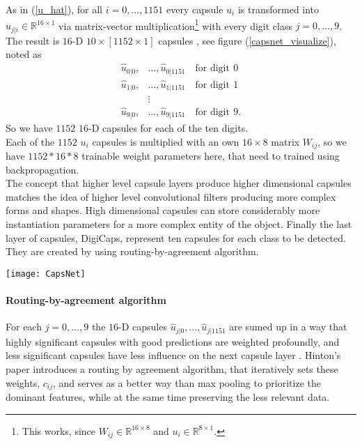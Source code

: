 \documentclass{article}
\begin{document}
{As in (\ref{u_hat}), for all $i=0, \ldots, 1151$ every capsule $u_i$ is transformed into $\hat{u}_{j|i} \in \mathbb{R}^{16 \times 1}$ via matrix-vector multiplication\footnote{This works, since $W_{ij} \in \mathbb{R}^{16 \times 8}$ and $u_i \in \mathbb{R}^{8 \times 1}$.} with every digit class $j = 0, \ldots ,9$.
The result is  $16$-D $10 \times [1152 \times 1]$  capsules , see figure (\ref{capsnet_visualize}), noted as
\begin{align*}
\hat{u}_{0|0}, &\ldots , \hat{u}_{0|1151} \quad \text{for digit} \ \, 0 \\
\hat{u}_{1|0}, &\ldots, \hat{u}_{1|1151} \quad \text{for digit} \ \, 1 \\
& \vdots \\
\hat{u}_{9|0}, &\ldots, \hat{u}_{9|1151} \quad \text{for digit} \ \, 9.
\end{align*}
So we have $1152$ $16$-D capsules for each of the ten digits.\\
Each of the $1152$ $u_i$ capsules is multiplied with an own $16 \times 8$ matrix $W_{ij}$, so we have $1152*16*8$ trainable weight parameters here, that need to trained using backpropagation.\\
The concept that higher level capsule layers produce higher dimensional capsules matches the idea of higher level convolutional filters producing more complex forms and shapes. High dimensional capsules can store considerably more instantiation parameters for a more complex entity of the object. Finally the last layer of capsules, DigiCaps, represent ten capsules for each class to be detected. They are created by using routing-by-agreement algorithm.

\begin{figure*}[!htb]
\vskip 0.2in
\begin{center}
\centerline{\texttt{[image: CapsNet]}}
\caption{A visualization of PrimaryCaps and DigitCaps \cite{medium:visualpic} \\ Caution, this figure has an error: $\hat{u}_{i|j}$ instead of $\hat{u}_{j|i}$ }\label{capsnet_visualize}
\end{center}
\vskip -0.2in
\end{figure*}

\paragraph{Routing-by-agreement algorithm} 
\label{routing_by_agreement}

For each $j=0, \ldots, 9$ the $16$-D capsules $\hat{u}_{j|0}, \ldots , \hat{u}_{j|1151}$ are sumed up in a way that highly significant capsules with good predictions are weighted profoundly, and less significant capsules have less influence on the next capsule layer \cite{hinton17}. Hinton's paper \cite{hinton17} introduces a routing by agreement algorithm, that iteratively sets these weights, $c_{ij}$, and serves as a better way than max pooling to prioritize the dominant features, while at the same time preserving the less relevant data. 

}
\end{document}
